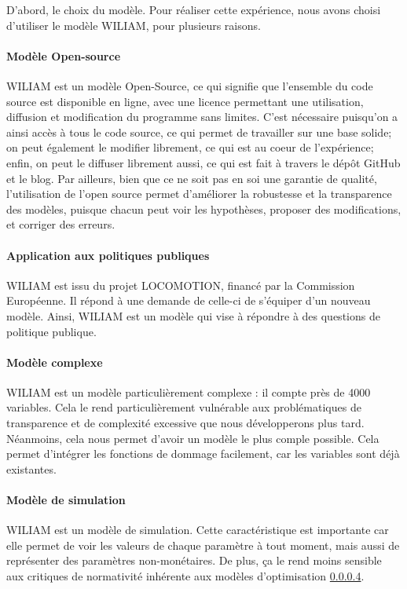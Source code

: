 D'abord, le choix du modèle. Pour réaliser cette expérience, nous avons choisi d'utiliser le modèle WILIAM, pour plusieurs raisons. 

\paragraph{Modèle Open-source}WILIAM est un modèle Open-Source, ce qui signifie que l'ensemble du code source est disponible en ligne, avec une licence permettant une utilisation, diffusion et modification du programme sans limites. C'est nécessaire puisqu'on a ainsi accès à tous le code source, ce qui permet de travailler sur une base solide; on peut également le modifier librement, ce qui est au coeur de l'expérience; enfin, on peut le diffuser librement aussi, ce qui est fait à travers le dépôt GitHub et le blog. Par ailleurs, bien que ce ne soit pas en soi une garantie de qualité, l'utilisation de l'open source permet d'améliorer la robustesse et la transparence des modèles, puisque chacun peut voir les hypothèses, proposer des modifications, et corriger des erreurs. 

\paragraph{Application aux politiques publiques} WILIAM est issu du projet LOCOMOTION, financé par la Commission Européenne. Il répond à une demande de celle-ci de s'équiper d'un nouveau modèle. Ainsi, WILIAM est un modèle qui vise à répondre à des questions de politique publique. 

\paragraph{Modèle complexe} WILIAM est un modèle particulièrement complexe : il compte près de 4000 variables. Cela le rend particulièrement vulnérable aux problématiques de transparence et de complexité excessive que nous développerons plus tard. Néanmoins, cela nous permet d'avoir un modèle le plus comple possible. Cela permet d'intégrer les fonctions de dommage facilement, car les variables sont déjà existantes. 

\paragraph{Modèle de simulation} WILIAM est un modèle de simulation. Cette caractéristique est importante car elle permet de voir les valeurs de chaque paramètre à tout moment, mais aussi de représenter des paramètres non-monétaires. De plus, ça le rend moins sensible aux critiques de normativité inhérente aux modèles d'optimisation \ref{}. 

